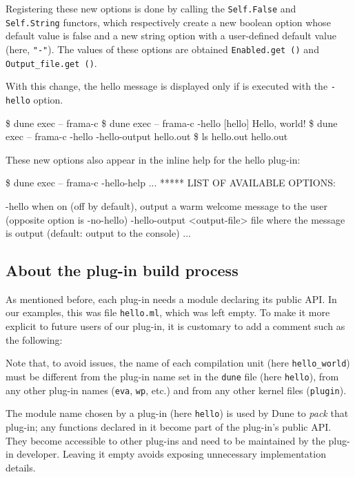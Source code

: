 Registering these new options is done by calling the \texttt{Self.False} and
\texttt{Self.String} functors, which respectively create a new boolean option
whose default value is false and a new string option with a user-defined
default value (here, \texttt{"-"}). The values of these options are obtained
\via \texttt{Enabled.get ()} and \texttt{Output\_file.get ()}.

With this change, the hello message is displayed only if \framac is
executed with the \texttt{-hello} option.
\begin{frama-c-commands}
\$ dune exec -- frama-c
\$ dune exec -- frama-c -hello
[hello] Hello, world!
\$ dune exec -- frama-c -hello -hello-output hello.out
\$ ls hello.out
hello.out
\end{frama-c-commands}

These new options also appear in the inline help for the hello plug-in:
\begin{frama-c-commands}
\$ dune exec -- frama-c -hello-help
...
***** LIST OF AVAILABLE OPTIONS:

-hello              when on (off by default), output a warm welcome message
                    to the user (opposite option is -no-hello)
-hello-output <output-file>  file where the message is output (default:
                    output to the console)
...
\end{frama-c-commands}

\subsection{About the plug-in build process}

As mentioned before, each plug-in needs a module declaring its public API.
In our examples, this was file \verb|hello.ml|, which was left empty.
To make it more explicit to future users of our plug-in, it is customary to
add a comment such as the following:


Note that, to avoid issues, the name of each compilation unit
(here \texttt{hello\_world}) must be different from the plug-in name set in
the \texttt{dune} file (here \texttt{hello}), from any other plug-in names
(\eg \texttt{eva}, \texttt{wp}, etc.) and from any other \framac kernel
\caml files (\eg \texttt{plugin}).

The module name chosen by a plug-in (here \texttt{hello}) is used by Dune to
{\em pack} that plug-in; any functions declared in it become part of the
plug-in's public API. They become accessible to other plug-ins and need to be
maintained by the plug-in developer. Leaving it empty avoids exposing
unnecessary implementation details.


